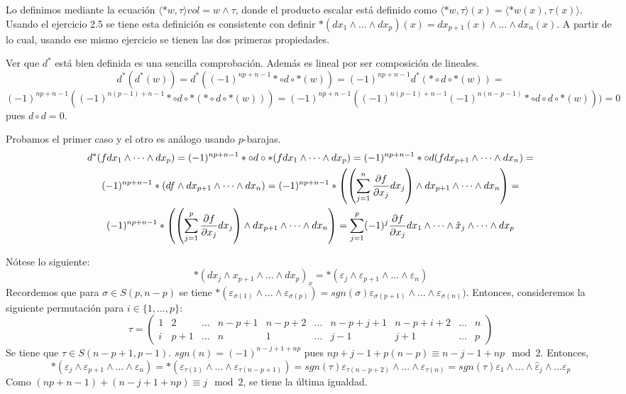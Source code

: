 \documentclass[twoside]{article}
\begin{document}
\begin{solucion}
Lo definimos mediante la ecuación $\langle *w,\tau\rangle vol =w\land\tau$, donde el producto escalar está definido como $\langle *w,\tau\rangle(x)=\langle *w(x), \tau(x)\rangle$. Usando el ejercicio 2.5 se tiene esta definición es consistente con definir $*(dx_1\land\dots\land dx_p)(x)=dx_{p+1}(x)\land\dots\land dx_n(x)$. A partir de lo cual, usando ese mismo ejercicio se tienen las dos primeras propiedades.

Ver que $d^*$ está bien definida es una sencilla comprobación. Además es lineal por ser composición de lineales.
\[
d^*(d^*(w))=d^*((-1)^{np+n-1}*\circ d\circ *(w))=(-1)^{np+n-1}d^*(*\circ d\circ *(w))=
\]
\[
(-1)^{np+n-1}((-1)^{n(p-1)+n-1}*\circ d\circ *(*\circ d\circ *(w)))=(-1)^{np+n-1}((-1)^{n(p-1)+n-1}(-1)^{n(n-p-1)}*\circ d\circ d\circ *(w)))=0
\]
pues $d\circ d=0$.

Probamos el primer caso y el otro es análogo usando $p$-barajas.
\begin{gather*}
d^*(fdx_1\land\dots\land dx_p)=(-1)^{np+n-1}*\circ d\circ *(fdx_1\land\dots\land dx_p)=(-1)^{np+n-1}*\circ d( f dx_{p+1}\land\dots\land dx_n)=\\
(-1)^{np+n-1}*(d f\land dx_{p+1}\land\dots\land dx_n)=(-1)^{np+n-1}*\left(\left(\sum_{j=1}^n\frac{\partial f}{\partial x_j}dx_j\right)\land dx_{p+1}\land\dots\land dx_n\right)=\\
(-1)^{np+n-1}*\left(\left(\sum_{j=1}^p\frac{\partial f}{\partial x_j}dx_j\right)\land dx_{p+1}\land\dots\land dx_n\right)=\sum_{j=1}^p(-1)^j\frac{\partial f}{\partial x_j}dx_1\land\dots\land\hat{x}_j\land\dots\land dx_p
\end{gather*}

Nótese lo siguiente:
\[
*(dx_j\land x_{p+1}\land\dots\land dx_p)_x=*(\varepsilon_j\land\varepsilon_{p+1}\land\dots\land\varepsilon_n)
\]
Recordemos que para $\sigma\in S(p,n-p)$ se tiene $*(\varepsilon_{\sigma(1)}\land\dots\land\varepsilon_{\sigma(p)})=sgn(\sigma)\varepsilon_{\sigma(p+1)}\land\dots\land\varepsilon_{\sigma(n)})$. Entonces, consideremos la siguiente permutación para $i\in\{1,\dots, p\}$:
\[
\tau=\begin{pmatrix}
1 & 2 & \dots &   n-p+1 & n-p+2& \dots & n-p+j+1 &n-p+i+2 & \dots & n\\
i & p+1 & \dots & n      & 1   & \dots & j-1     & j+1    &\dots & p
\end{pmatrix}
\]
Se tiene que $\tau\in S(n-p+1,p-1)$. $sgn(n)=(-1)^{n-j+1+np}$ pues $np+j-1+p(n-p)\equiv n-j-1+np\mod 2$.  Entonces,
\[
*(\varepsilon_j\land\varepsilon_{p+1}\land\dots\land\varepsilon_n)=*(\varepsilon_{\tau(1)}\land\dots\land\varepsilon_{\tau(n-p+1)})=sgn(\tau)\varepsilon_{\tau(n-p+2)}\land\dots\land\varepsilon_{\tau(n)}=sgn(\tau)\varepsilon_1\land\dots\land\hat{\varepsilon}_j\land\dots\varepsilon_p
\]
Como $(np+n-1)+(n-j+1+np)\equiv j\mod 2$, se tiene la última igualdad.


\end{solucion}
\end{document}
